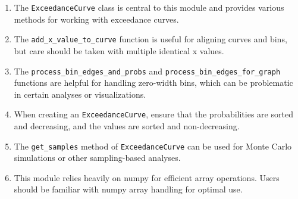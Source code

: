 \documentclass{article}
\begin{document}
\begin{enumerate}
    \item The \texttt{ExceedanceCurve} class is central to this module and provides various methods for working with exceedance curves.

    \item The \texttt{add\_x\_value\_to\_curve} function is useful for aligning curves and bins, but care should be taken with multiple identical x values.

    \item The \texttt{process\_bin\_edges\_and\_probs} and \texttt{process\_bin\_edges\_for\_graph} functions are helpful for handling zero-width bins, which can be problematic in certain analyses or visualizations.

    \item When creating an \texttt{ExceedanceCurve}, ensure that the probabilities are sorted and decreasing, and the values are sorted and non-decreasing.

    \item The \texttt{get\_samples} method of \texttt{ExceedanceCurve} can be used for Monte Carlo simulations or other sampling-based analyses.

    \item This module relies heavily on numpy for efficient array operations. Users should be familiar with numpy array handling for optimal use.
\end{enumerate}
\end{document}
